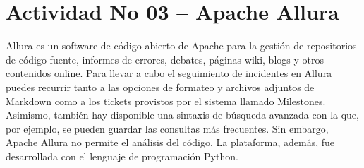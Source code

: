 \section{Actividad No 03 – Apache Allura} 
Allura es un software de código abierto de Apache para la gestión de repositorios de código fuente, informes de errores, debates, páginas wiki, blogs y otros contenidos online. Para llevar a cabo el seguimiento de incidentes en Allura puedes recurrir tanto a las opciones de formateo y archivos adjuntos de Markdown como a los tickets provistos por el sistema llamado Milestones. Asimismo, también hay disponible una sintaxis de búsqueda avanzada con la que, por ejemplo, se pueden guardar las consultas más frecuentes. Sin embargo, Apache Allura no permite el análisis del código. La plataforma, además, fue desarrollada con el lenguaje de programación Python.

